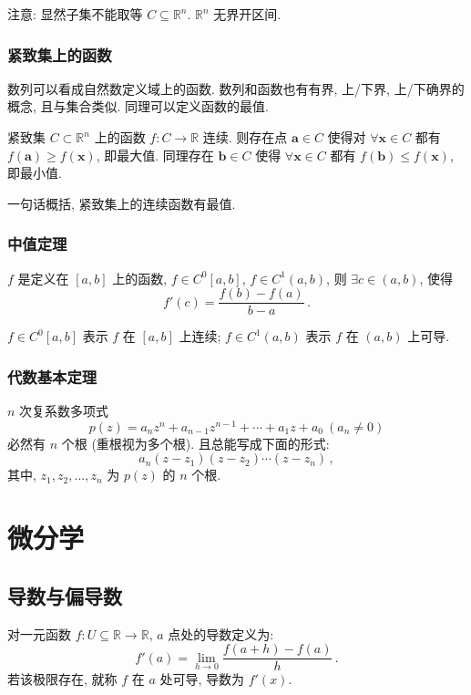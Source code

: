 \documentclass[UTF8]{ctexart}
\newcommand{\ve}[1]{\boldsymbol{\mathbf{#1}}}
\newcommand{\R}{\mathbb R}
\begin{document}
注意: 显然子集不能取等 $ C \subseteq \R^n $. $ \R^n $ 无界开区间.

\subsubsection{紧致集上的函数}
数列可以看成自然数定义域上的函数. 数列和函数也有有界, 上/下界, 上/下确界的概念, 且与集合类似. 同理可以定义函数的最值.

\begin{theorem}
    紧致集 $ C \subset \R^n $ 上的函数 $ f : C \to \R $ 连续. 则存在点 $ \ve a \in C $ 使得对 $ \forall \ve x \in C $ 都有 $ f(\ve a) \geqslant f(\ve x) $, 即最大值. 同理存在 $ \ve b \in C $ 使得 $ \forall \ve x \in C $ 都有 $ f(\ve b) \leqslant f(\ve x) $, 即最小值.
\end{theorem}

一句话概括, 紧致集上的连续函数有最值.

\subsubsection{中值定理}
\begin{theorem}
    $ f $ 是定义在 $ [a, b] $ 上的函数, $ f \in C^0[a, b] $, $ f \in C^1(a, b) $, 则 $ \exists c \in (a, b) $, 使得 \[ f'(c) = \dfrac{f(b) - f(a)}{b - a} \,.\]
\end{theorem}

$ f \in C^0 [a, b] $ 表示 $ f $ 在 $ [a, b] $ 上连续; $ f \in C^1 (a, b) $ 表示 $ f $ 在 $ (a, b) $ 上可导.

\subsubsection{代数基本定理}
\begin{theorem}
    $ n $ 次复系数多项式 \[ p(z) = a_n z^n + a_{n-1} z^{n-1} + \cdots + a_1 z + a_0 \ (a_n \neq 0) \] 必然有 $ n $ 个根 \rm{(}重根视为多个根\rm{)}. 且总能写成下面的形式: \[ a_n (z - z_1)(z - z_2) \cdots (z - z_n) \,,\] 其中, $ z_1, z_2, \dots, z_n $ 为 $ p(z) $ 的 $ n $ 个根.
\end{theorem}

\section{微分学}
\subsection{导数与偏导数}
\begin{definition}[\text{导数}]
    对一元函数 $ f: U \subseteq \R \to \R $, $ a $ 点处的导数定义为:\[ f'(a) = \lim_{h \to 0} \dfrac{f(a+h) - f(a)}{h} \,.\] 若该极限存在, 就称 $ f $ 在 $ a $ 处可导, 导数为 $ f'(x) $.
\end{definition}
\end{document}
